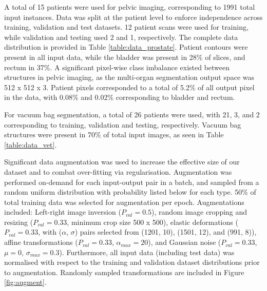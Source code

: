 A total of 15 patients were used for pelvic imaging, corresponding to 1991 total input instances. Data was split at the patient level to enforce independence across training, validation and test datasets. 12 patient scans were used for training, while validation and testing used 2 and 1, respectively. The complete data distribution is provided in Table \ref{table:data_prostate}. Patient contours were present in all input data, while the bladder was present in 28\% of slices, and rectum in 37\%. A significant pixel-wise class imbalance existed between structures in pelvic imaging, as the multi-organ segmentation output space was 512 x 512 x 3. Patient pixels corresponded to a total of 5.2\% of all output pixel in the data, with 0.08\% and 0.02\% corresponding to bladder and rectum.



For vacuum bag segmentation, a total of 26 patients were used, with 21, 3, and 2 corresponding to training, validation and testing, respectively. Vacuum bag structures were present in 70\% of total input images, as seen in Table \ref{table:data_vet}.




Significant data augmentation was used to increase the effective size of our dataset and to combat over-fitting via regularisation.
Augmentation was performed on-demand for each input-output pair in a batch, and sampled from a random uniform distribution with probability listed below for each type. 50\% of total training data was selected for augmentation per epoch. Augmentations included: Left-right image inversion ($P_{val}=0.5$), random image cropping and resizing ($P_{val}=0.33$, minimum crop size 500 x 500), elastic deformations ($P_{val}=0.33$, with ($\alpha$, $\sigma$) pairs selected from (1201, 10), (1501, 12), and (991, 8)), affine transformations ($P_{val}=0.33$, $\alpha_{max}=20$), and Gaussian noise ($P_{val}=0.33$, $\mu=0$, $\sigma_{max}=0.3$). Furthermore, all input data (including test data) was normalised with respect to the training and validation dataset distributions prior to augmentation. Randomly sampled transformations are included in Figure \ref{fig:augment}.

